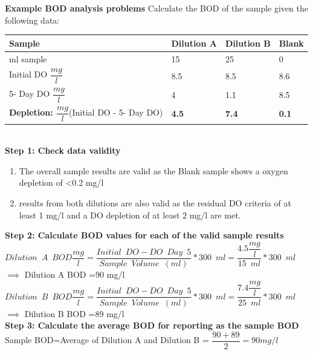 \textbf{Example BOD analysis problems}
Calculate the BOD of the sample given the following data:\\
\vspace{0.5cm}
\fontsize{11}{9}
\renewcommand{\arraystretch}{1.3}
\begin{tabular}{p{6cm} | p{2cm} | p{2cm}| p{2cm}}
\hline
\hline
Sample & Dilution A & Dilution B & Blank\\ [0.2ex] 
\hline
ml \enspace sample & 15  & 25 & 0\\ 
\hline
Initial \enspace DO \small{$\dfrac{mg}{l}$} & 8.5 & 8.5 & 8.6\\ 
\hline
5- Day \enspace DO \small{$\dfrac{mg}{l}$} & 4 & 1.1 & 8.5\\ [1ex] 
\hline
\hline
\textbf{Depletion: \newline $\dfrac{mg}{l}$}(Initial \enspace DO \enspace - 5- Day \enspace DO) & \textbf{4.5} & \textbf{7.4} & \textbf{0.1}\\
\end{tabular}\\
\vspace{0.5cm}
\textbf{Step 1: Check data validity}\\
\begin{enumerate}[1.]
\item The overall sample results are valid as the Blank sample shows a oxygen depletion of <0.2 mg/l
\item results from both dilutions are also valid as the residual DO criteria of at least 1 mg/l and a DO depletion of at least 2 mg/l are met.
\end{enumerate}
\vspace{0.5cm}
\textbf{Step 2: Calculate BOD values for each of the valid sample results}\\
\vspace{0.5cm}
$Dilution \enspace A \enspace BOD \dfrac{mg}{l}= \dfrac{Initial \enspace DO - DO \enspace Day \enspace 5}{Sample \enspace Volume \enspace (ml)}*300 \enspace ml= \dfrac{4.5\dfrac{mg}{l} }{15 \enspace ml}*300 \enspace ml$\\
$\implies$
Dilution \enspace A \enspace BOD =90 mg/l\\
\vspace{6mm}
$Dilution \enspace B \enspace BOD \dfrac{mg}{l}= \dfrac{Initial \enspace DO - DO \enspace Day \enspace 5}{Sample \enspace Volume \enspace (ml)}*300 \enspace ml= \dfrac{7.4\dfrac{mg}{l} }{25 \enspace ml}*300 \enspace ml$\\
$\implies$
Dilution \enspace B \enspace BOD =89 mg/l\\
\vspace{6mm}
\textbf{Step 3: Calculate the average BOD for reporting as the sample BOD}\\
\vspace{0.5cm}
Sample BOD=Average of Dilution A and Dilution B = $\dfrac{90+89}{2}=\boxed{90mg/l}$


